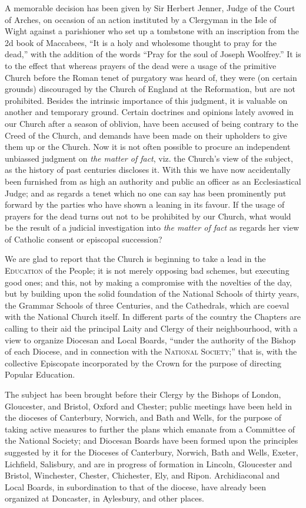 A memorable decision has been given by Sir Herbert
Jenner, Judge of the Court of Arches, on occasion of an action
instituted by a Clergyman in the Isle of Wight against a parishioner who
set up a tombstone with an inscription from the 2d book of Maccabees, ``It
is a holy and wholesome thought to pray for the dead,'' with the addition
of the words ``Pray for the soul of Joseph Woolfrey.'' It is to the effect
that whereas prayers of the dead were a usage of the primitive Church
before the Roman tenet of purgatory was heard of, they were (on certain
grounds) discouraged by the Church of England at the Reformation, but
are not prohibited. Besides the intrinsic importance of this judgment,
it is valuable on another and temporary ground. Certain doctrines and
opinions lately avowed in our Church after a season of oblivion, have
been accused of being contrary to the Creed of the Church, and demands
have been made on their upholders to give them up or the Church. Now it
is not often possible to procure an independent unbiassed judgment on \emph{the
matter of fact}, viz. the Church's view of the subject, as the
history of past centuries discloses it. With this we have now
accidentally been furnished from as high an authority and public an
officer as an Ecclesiastical Judge; and as regards a tenet which no one
can say has been prominently put forward by the parties who have shown a
leaning in its favour. If the usage of prayers for the dead turns out
not to be prohibited by our Church, what would be the result of a
judicial investigation into \emph{the matter of fact} as regards her
view of Catholic consent or episcopal succession?

We are glad to report that the Church is beginning
to take a lead in the E\textsc{ducation} of the People; it
is not merely opposing bad schemes, but executing good ones; and this,
not by making a compromise with the novelties of the day, but by
building upon the solid foundation of the National Schools of thirty
years, the Grammar Schools of three Centuries, and the Cathedrals, which
are coeval with the National Church itself. In different parts of the
country the Chapters are calling to their aid the principal Laity and
Clergy of their neighbourhood, with a view to organize Diocesan and
Local Boards, ``under the authority of the Bishop of each Diocese, and in
connection with the N\textsc{ational} S\textsc{ociety};''
that is, with the collective Episcopate incorporated by the Crown for
the purpose of directing Popular Education.

The subject has been brought before their Clergy by
the Bishops of London, Gloucester, and Bristol, Oxford and Chester;
public meetings have been held in the dioceses of Canterbury,
Norwich, and Bath and Wells, for the purpose of taking active measures
to further the plans which emanate from a Committee of the National
Society; and Diocesan Boards have been formed upon the principles
suggested by it for the Dioceses of Canterbury, Norwich, Bath and Wells,
Exeter, Lichfield, Salisbury, and are in progress of formation in
Lincoln, Gloucester and Bristol, Winchester, Chester, Chichester, Ely,
and Ripon. Archidiaconal and Local Boards, in subordination to that of
the diocese, have already been organized at Doncaster, in Aylesbury, and
other places.

